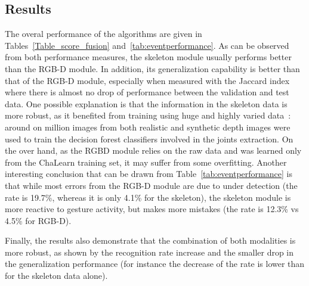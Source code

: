 \subsection{Results}\label{sec:results}


%
The overal performance of the algorithms are given in Tables~\ref{Table_score_fusion} and~\ref{tab:eventperformance}.
%
As can be observed from both performance measures, the skeleton module usually  performs better than the RGB-D module.
In addition, its generalization capability  is better than that of the RGB-D module,
especially when measured with the Jaccard index where there is almost no drop of performance between the validation and test data.
%
One possible explanation is that the information in the skeleton data is more robust, as it benefited from training using huge and highly
varied data~\cite{shotton2011real}: around on million images from both realistic and synthetic depth images were used to train
the decision forest classifiers involved in the joints extraction.
%
On the over hand, as the  RGBD module relies on  the raw data and was learned only from the ChaLearn training set, it may
suffer from some overfitting.
%
Another interesting conclusion that can be drawn from Table~\ref{tab:eventperformance} is that while most errors from the RGB-D module are due to under detection
(the \eventmissed rate is 19.7\%, whereas it is only 4.1\% for the skeleton), the skeleton module is more reactive to gesture activity, but makes more mistakes
(the \eventconfused rate is 12.3\% vs 4.5\% for RGB-D).


Finally, the results also demonstrate  that the combination of both modalities is more robust,
as shown by the recognition rate increase and the smaller drop in the generalization performance
(for instance the decrease of the \eventaccuracy rate is lower than for the skeleton data alone).



